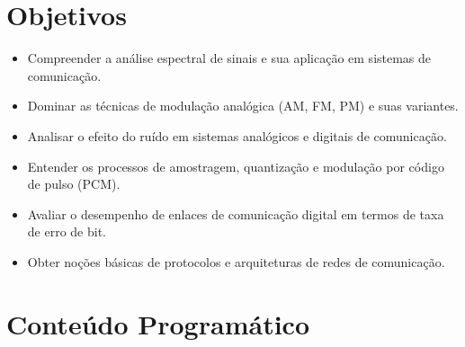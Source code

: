 \documentclass[11pt,a4paper]{article}
\begin{document}
\section{Objetivos}

\begin{itemize}[noitemsep]
  \item Compreender a análise espectral de sinais e sua aplicação em sistemas de comunicação.
  \item Dominar as técnicas de modulação analógica (AM, FM, PM) e suas variantes.
  \item Analisar o efeito do ruído em sistemas analógicos e digitais de comunicação.
  \item Entender os processos de amostragem, quantização e modulação por código de pulso (PCM).
  \item Avaliar o desempenho de enlaces de comunicação digital em termos de taxa de erro de bit.
  \item Obter noções básicas de protocolos e arquiteturas de redes de comunicação.
\end{itemize}

\section{Conteúdo Programático}
\end{document}
